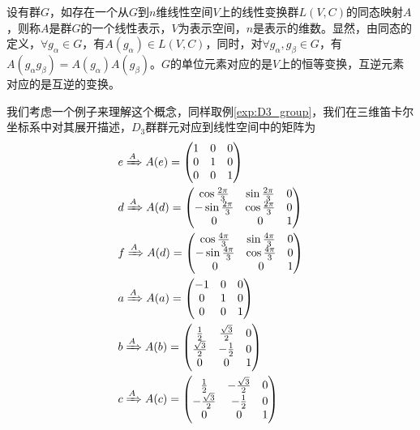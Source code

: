 \begin{definition}
	设有群$G$，如存在一个从$G$到$n$维线性空间$V$上的线性变换群$L(V,C)$的同态映射$A$，则称$A$是群$G$的一个线性表示，$V$为表示空间，$n$是表示的维数。显然，由同态的定义，$\forall g_\alpha \in G$，有$A(g_\alpha) \in L(V, C)$，同时，对$\forall g_\alpha, g_\beta \in G$，有$A(g_\alpha g_\beta) = A(g_\alpha)A(g_\beta)$。$G$的单位元素对应的是$V$上的恒等变换，互逆元素对应的是互逆的变换。
\end{definition}
我们考虑一个例子来理解这个概念，同样取例\ref{exp:D3_group}，我们在三维笛卡尔坐标系中对其展开描述，$D_3$群群元对应到线性空间中的矩阵为
\begin{equation*}
	\begin{aligned}
		&e \xRightarrow[]{A}
		A(e) = 
		\begin{pmatrix}
			1	&	0	&	0	\\
			0	&	1	&	0	\\
			0	&	0	&	1
		\end{pmatrix}
		\\
		&d \xRightarrow[]{A}
		A(d) =
		\begin{pmatrix}
			\cos \frac{2\pi}{3}	&	\sin \frac{2\pi}{3}	&	0	\\
			-\sin	\frac{2\pi}{3}	&	\cos \frac{2\pi}{3}	&	0	\\
			0	&	0	&	1
		\end{pmatrix}
		\\
		&f \xRightarrow[]{A}
		A(d) =
		\begin{pmatrix}
			\cos  \frac{4\pi}{3}	&	\sin \frac{4\pi}{3}	&	0	\\
			-\sin \frac{4\pi}{3}	&	\cos \frac{4\pi}{3}	&	0	\\
			0						&	0					&	1
		\end{pmatrix}
		\\
		&a \xRightarrow[]{A}
		A(a) =
		\begin{pmatrix}
			-1	&	0	&	0	\\
			0	&	1	&	0	\\
			0	&	0	&	1
		\end{pmatrix}
		\\
		&b \xRightarrow[]{A}
		A(b) =
		\begin{pmatrix}
			\frac{1}{2}			&	\frac{\sqrt{3}}{2}	&	0	\\
			\frac{\sqrt{3}}{2}	&	-\frac{1}{2}		&	0	\\
			0					&	0					&	1
		\end{pmatrix}
		\\
		&c \xRightarrow[]{A}
		A(c) =
		\begin{pmatrix}
			\frac{1}{2}			&	-\frac{\sqrt{3}}{2}	&	0	\\
			-\frac{\sqrt{3}}{2}	&	-\frac{1}{2}		&	0	\\
			0					&	0					&	1
		\end{pmatrix}
	\end{aligned}
\end{equation*} 
